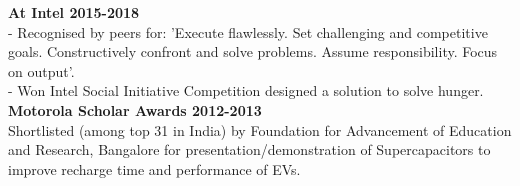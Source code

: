 
\reversemarginpar {}
\noindent \textbf{At Intel \hfill 2015-2018 
}\\
- Recognised by peers for: 'Execute flawlessly. Set challenging and competitive goals. Constructively confront and solve problems. Assume responsibility. Focus on output'.\\
- Won Intel Social Initiative Competition designed a solution to solve hunger.
\\
\noindent \textbf{Motorola Scholar Awards \hfill 2012-2013
}\\
Shortlisted (among top 31 in India) by Foundation for Advancement of Education and Research, Bangalore for presentation/demonstration of Supercapacitors to improve recharge time and performance of EVs.
\\
